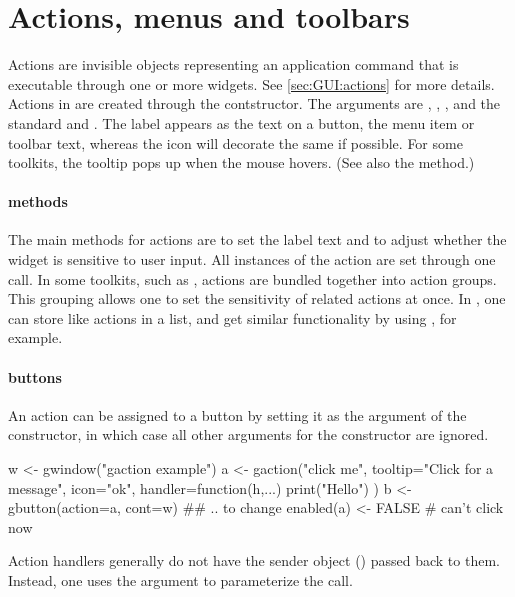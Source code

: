 \section{Actions, menus and toolbars}
\label{sec:gWidgets-acti-menus-toolb}


Actions are invisible objects representing an application command that
is executable through one or more widgets. See \ref{sec:GUI:actions}
for more details. Actions in  are created through the
 contstructor. The arguments are
, ,
,  and the
standard  and
. The label appears as the text on a button,
the menu item or toolbar text, whereas the icon will decorate the same
if possible. For some toolkits, the tooltip pops up when the mouse
hovers.  (See also the  method.)

\paragraph{methods}
The main methods for actions are  to
set the label text and  to adjust
whether the widget is sensitive to user input. All instances of the
action are set through one call. In some toolkits, such as
, actions are bundled together into action groups. This
grouping allows one to set the sensitivity of related actions at
once. In \R, one can store like actions in a list, and get similar
functionality by using , for example.

\paragraph{buttons}
An action can be assigned to a button by setting it as the
 argument of the  constructor,
in which case all other arguments for the constructor are ignored.

\begin{Schunk}
\begin{Sinput}
 w <- gwindow("gaction example")
 a <- gaction("click me", tooltip="Click for a message", icon="ok", 
              handler=function(h,...) {
                print("Hello")
                })
 b <- gbutton(action=a, cont=w)
 ## .. to change
 enabled(a) <- FALSE                     # can't click now
\end{Sinput}
\end{Schunk}
Action handlers generally do not have the sender object ()
passed back to them. Instead, one uses
the  argument to parameterize the call.



